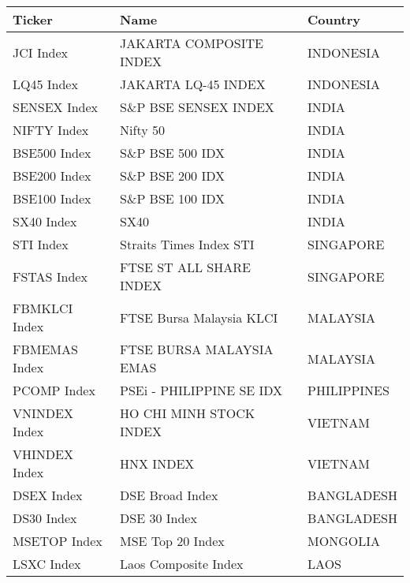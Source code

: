\begin {table}[H]
\begin{center}
\small
\hspace*{-3cm}
\begin{tabu}{| l l l |} 
\hline
Ticker & Name & Country\\
\hline
JCI Index & JAKARTA COMPOSITE INDEX & INDONESIA \\ 
LQ45 Index & JAKARTA LQ-45 INDEX & INDONESIA \\ 
SENSEX Index & S\&P BSE SENSEX INDEX & INDIA \\ 
NIFTY Index & Nifty 50 & INDIA \\ 
BSE500 Index & S\&P BSE 500 IDX & INDIA \\ 
BSE200 Index & S\&P BSE 200 IDX & INDIA \\ 
BSE100 Index & S\&P BSE 100 IDX & INDIA \\ 
SX40 Index & SX40 & INDIA \\ 
STI Index & Straits Times Index STI & SINGAPORE \\ 
FSTAS Index & FTSE ST ALL SHARE INDEX & SINGAPORE \\ 
FBMKLCI Index & FTSE Bursa Malaysia KLCI & MALAYSIA \\ 
FBMEMAS Index & FTSE BURSA MALAYSIA EMAS & MALAYSIA \\ 
PCOMP Index & PSEi - PHILIPPINE SE IDX & PHILIPPINES \\ 
VNINDEX Index & HO CHI MINH STOCK INDEX & VIETNAM \\ 
VHINDEX Index & HNX INDEX & VIETNAM \\ 
DSEX Index & DSE Broad Index & BANGLADESH \\ 
DS30 Index & DSE 30 Index & BANGLADESH \\ 
MSETOP Index & MSE Top 20 Index & MONGOLIA \\ 
LSXC Index & Laos Composite Index & LAOS \\ 
\hline
\end{tabu}
\hspace*{-3cm}
\small
\end{center}
\end{table}
